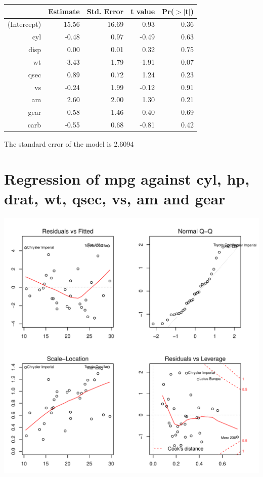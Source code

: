 \documentclass{article}\usepackage[]{graphicx}\usepackage[]{color}
\makeatletter
\def\maxwidth{ %
  \ifdim\Gin@nat@width>\linewidth
    \linewidth
  \else
    \Gin@nat@width
  \fi
}
\newenvironment{knitrout}{}{} %
\makeatother
\begin{document}
\begin{table}[ht]
\centering
\begin{tabular}{rrrrr}
  \hline
 & Estimate & Std. Error & t value & Pr($>$$|$t$|$) \\ 
  \hline
(Intercept) & 15.56 & 16.69 & 0.93 & 0.36 \\ 
  cyl & -0.48 & 0.97 & -0.49 & 0.63 \\ 
  disp & 0.00 & 0.01 & 0.32 & 0.75 \\ 
  wt & -3.43 & 1.79 & -1.91 & 0.07 \\ 
  qsec & 0.89 & 0.72 & 1.24 & 0.23 \\ 
  vs & -0.24 & 1.99 & -0.12 & 0.91 \\ 
  am & 2.60 & 2.00 & 1.30 & 0.21 \\ 
  gear & 0.58 & 1.46 & 0.40 & 0.69 \\ 
  carb & -0.55 & 0.68 & -0.81 & 0.42 \\ 
   \hline
\end{tabular}
\end{table}




The standard error of the model is 2.6094

\newpage

\section{Regression of mpg against cyl, hp, drat, wt, qsec, vs, am and gear }
\begin{knitrout}
\color{fgcolor}

{\centering \includegraphics[width=\maxwidth]{figure/lm-cyl-hp-drat-wt-qsec-vs-am-gear} 

}



\end{knitrout}
\end{document}
